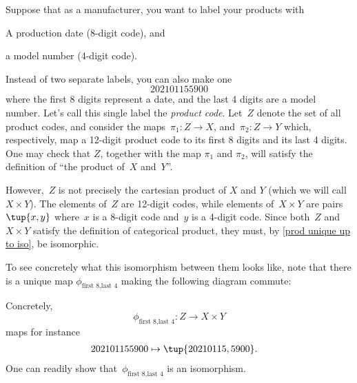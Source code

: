 \begin{example}
  \label{ex univ prop prod}
  Suppose that as a manufacturer, you want to label your products with
  \begin{compactitem}
    \item A production date (8-digit code), and
    \item a model number (4-digit code).
  \end{compactitem}
  Instead of two separate labels, you can also make one
  \begin{equation}\label{eq:exa-prod-univ-prop-code}
    202101155900
  \end{equation}
  where the first 8 digits represent a date, and the last 4 digits are a model number.
  Let's call this single label the \emph{product code}. Let~$Z$ denote the set of all product codes, and consider the maps~$\pi_1\colon Z\to X$, and~$\pi_2\colon Z\to Y$ which, respectively, map a 12-digit product code to its first 8 digits and its last 4 digits. One may check that $Z$, together with the map $\pi_1$ and $\pi_2$, will satisfy the definition of ``the product of~$X$ and~$Y$''.

  \begin{center}
    \label{fig:digits-1}
  \end{center}

  However,~$Z$ is not precisely the cartesian product of $X$ and $Y$ (which we will call $X\times Y$). The elements of~$Z$ are 12-digit codes, while elements of~$X\times Y$ are pairs~$\tup{x,y}$ where~$x$ is a 8-digit code and~$y$ is a 4-digit code. Since both~$Z$ and~$X\times Y$ satisfy the definition of categorical product, they must, by \cref{prod unique up to iso}, be isomorphic.
  
  \begin{center}
    \label{fig:digits-3}
  \end{center}
  To see concretely what this isomorphism between them looks like, note that there is a unique map $\phi_{\text{first 8},\text{last 4}}$ making the following diagram commute:
  \begin{center}
    \label{fig:digits-2}
  \end{center}
  
  Concretely,~
 \begin{equation}\label{eq:exa-univ-iso}
 \phi_{\text{first 8},\text{last 4}}: Z \to X\times Y
\end{equation}
maps for instance
  \begin{equation}\label{eq:exa-univ-iso-concrete}
    \begin{aligned}
      202101155900&\mapsto \tup{20210115,5900}.
    \end{aligned}
  \end{equation}
  One can readily show that~$\phi_{\text{first 8},\text{last 4}}$ is an isomorphism.
\end{example}

